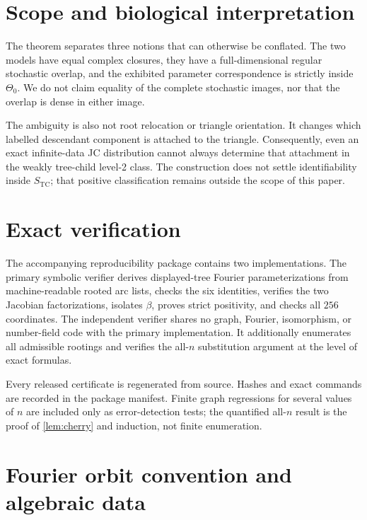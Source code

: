 \documentclass[11pt]{article}
\theoremstyle{remark}
\newcommand{\TCs}{S_{\mathrm{TC}}}
\begin{document}
\section{Scope and biological interpretation}

The theorem separates three notions that can otherwise be conflated.  The
two models have equal complex closures, they have a full-dimensional regular
stochastic overlap, and the exhibited parameter correspondence is strictly
inside $\Theta_0$.  We do not claim equality of the complete stochastic
images, nor that the overlap is dense in either image.

The ambiguity is also not root relocation or triangle orientation.  It
changes which labelled descendant component is attached to the triangle.
Consequently, even an exact infinite-data JC distribution cannot always
determine that attachment in the weakly tree-child level-2 class.  The
construction does not settle identifiability inside $\TCs$; that positive
classification remains outside the scope of this paper.

\section{Exact verification}\label{sec:verification}

The accompanying reproducibility package contains two implementations.  The
primary symbolic verifier derives displayed-tree Fourier parameterizations
from machine-readable rooted arc lists, checks the six identities, verifies
the two Jacobian factorizations, isolates $\beta$, proves strict positivity,
and checks all $256$ coordinates.  The independent verifier shares no graph,
Fourier, isomorphism, or number-field code with the primary implementation.
It additionally enumerates all admissible rootings and verifies the all-$n$
substitution argument at the level of exact formulas.

Every released certificate is regenerated from source.  Hashes and exact
commands are recorded in the package manifest.  Finite graph regressions for
several values of $n$ are included only as error-detection tests; the
quantified all-$n$ result is the proof of \cref{lem:cherry} and induction, not
finite enumeration.

\appendix
\section{Fourier orbit convention and algebraic data}\label{app:certificate}
\end{document}
